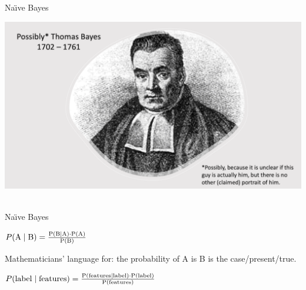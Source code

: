 \documentclass[handout]{beamer}
\begin{document}
\begin{frame}{Na\"{\i}ve Bayes}
	
	\begin{center}
		\includegraphics[width=\linewidth,height=\textheight,keepaspectratio]{../pictures/ThomasBayes.png} \\\
	\end{center}

	
	
	
\end{frame}



\begin{frame}{Na\"{\i}ve Bayes}
		
	$ P(\rm{A} \mid \rm{B}) = \frac{P(\rm{B} \mid \rm{A}) \cdot P(\rm{A})}{P(\rm{B})} $

	Mathematicians’ language for: the probability of A is B is the case/present/true. 

	$ P(\rm{label} \mid \rm{features}) = \frac{P(\rm{features} \mid \rm{label}) \cdot P(\rm{label})}{P(\rm{features})} $

	
	
	
	
\end{frame}
\end{document}

